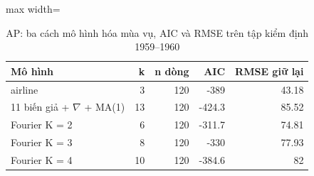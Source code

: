 \begin{table}[H]
\centering\small
\caption{AP: ba cách mô hình hóa mùa vụ, AIC và RMSE trên tập kiểm định 1959--1960}\label{tab:tab_b12_10_seasonality_models}
\begin{adjustbox}{max width=\linewidth}
\begin{tabular}{lrrrr}
\toprule
Mô hình & k & n dòng & AIC & RMSE giữ lại \\
\midrule
airline & 3 & 120 & -389 & 43.18 \\
11 biến giả + $\nabla$ + MA(1) & 13 & 120 & -424.3 & 85.52 \\
Fourier K = 2 & 6 & 120 & -311.7 & 74.81 \\
Fourier K = 3 & 8 & 120 & -330 & 77.93 \\
Fourier K = 4 & 10 & 120 & -384.6 & 82 \\
\bottomrule
\end{tabular}
\end{adjustbox}\par{}
\end{table}
